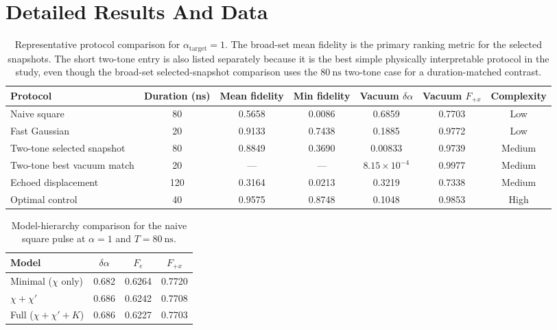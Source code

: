 \documentclass[aps,pra,twocolumn,reprint,floatfix,amsmath,amssymb]{revtex4-2}
\begin{document}
\appendix

\section{Detailed Results And Data}
\label{app:data}

\begin{table}[t]
  \centering
  \caption{Representative protocol comparison for \(\alpha_{\mathrm{target}}=1\). The broad-set mean fidelity is the primary ranking metric for the selected snapshots. The short two-tone entry is also listed separately because it is the best simple physically interpretable protocol in the study, even though the broad-set selected-snapshot comparison uses the \(\SI{80}{\nano\second}\) two-tone case for a duration-matched contrast.}
  \label{tab:protocols}
  \begin{tabular}{@{} l c c c c c c @{}}
    \toprule
    Protocol & Duration (ns) & Mean fidelity & Min fidelity & Vacuum \(\delta\alpha\) & Vacuum \(F_{+x}\) & Complexity \\
    \midrule
    Naive square & 80 & 0.5658 & 0.0086 & 0.6859 & 0.7703 & Low \\
    Fast Gaussian & 20 & 0.9133 & 0.7438 & 0.1885 & 0.9772 & Low \\
    Two-tone selected snapshot & 80 & 0.8849 & 0.3690 & 0.00833 & 0.9739 & Medium \\
    Two-tone best vacuum match & 20 & --- & --- & \(8.15\times10^{-4}\) & 0.9977 & Medium \\
    Echoed displacement & 120 & 0.3164 & 0.0213 & 0.3219 & 0.7338 & Medium \\
    Optimal control & 40 & 0.9575 & 0.8748 & 0.1048 & 0.9853 & High \\
    \bottomrule
  \end{tabular}
\end{table}

\begin{table}[tb]
  \centering
  \caption{Model-hierarchy comparison for the naive square pulse at \(\alpha=1\) and \(T=\SI{80}{\nano\second}\).}
  \label{tab:hierarchy}
  \begin{tabular}{@{} l c c c @{}}
    \toprule
    Model & \(\delta\alpha\) & \(F_e\) & \(F_{+x}\) \\
    \midrule
    Minimal (\(\chi\) only) & 0.682 & 0.6264 & 0.7720 \\
    \(\chi + \chi'\) & 0.686 & 0.6242 & 0.7708 \\
    Full (\(\chi + \chi' + K\)) & 0.686 & 0.6227 & 0.7703 \\
    \bottomrule
  \end{tabular}
\end{table}
\end{document}

